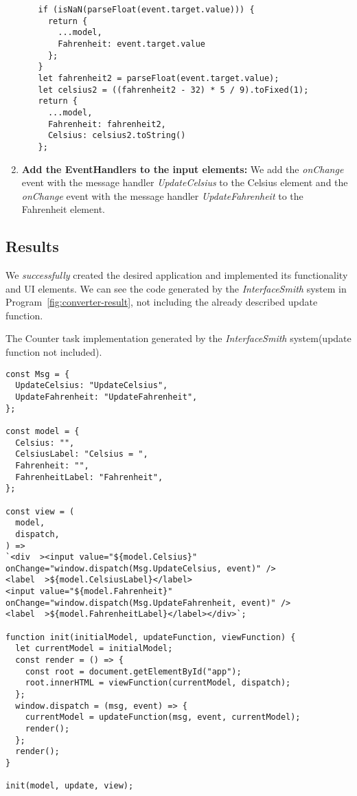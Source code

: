 \begin{enumerate}
\begin{itemize}
\begin{listing}[htbp]
			            \begin{lstlisting}
if (isNaN(parseFloat(event.target.value))) {
  return {
    ...model,
    Fahrenheit: event.target.value
  };
}
let fahrenheit2 = parseFloat(event.target.value);
let celsius2 = ((fahrenheit2 - 32) * 5 / 9).toFixed(1);
return {
  ...model,
  Fahrenheit: fahrenheit2,
  Celsius: celsius2.toString()
};            \end{lstlisting}

		            \end{listing}
	      \end{itemize}

	\item \textbf{Add the EventHandlers to the input elements:} We add the \emph{onChange} event with the message handler \emph{UpdateCelsius} to the Celsius element and the \emph{onChange} event with the message handler \emph{UpdateFahrenheit} to the Fahrenheit element.
\end{enumerate}
\medskip
\subsection{Results}
We \emph{successfully} created the desired application and implemented its functionality and UI elements.
We can see the code generated by the \emph{InterfaceSmith} system in Program~\ref{fig:converter-result}, not including the already described update function.

\begin{listing}[p]
	\caption {The Counter task implementation generated by the \emph{InterfaceSmith} system(update function not included).}
	\label{fig:converter-result}
	\begin{lstlisting}
const Msg = {
  UpdateCelsius: "UpdateCelsius",
  UpdateFahrenheit: "UpdateFahrenheit",
};

const model = {
  Celsius: "",
  CelsiusLabel: "Celsius = ",
  Fahrenheit: "",
  FahrenheitLabel: "Fahrenheit",
};

const view = (
  model,
  dispatch,
) =>
`<div  ><input value="${model.Celsius}" onChange="window.dispatch(Msg.UpdateCelsius, event)" />
<label  >${model.CelsiusLabel}</label>
<input value="${model.Fahrenheit}" onChange="window.dispatch(Msg.UpdateFahrenheit, event)" />
<label  >${model.FahrenheitLabel}</label></div>`;

function init(initialModel, updateFunction, viewFunction) {
  let currentModel = initialModel;
  const render = () => {
    const root = document.getElementById("app");
    root.innerHTML = viewFunction(currentModel, dispatch);
  };
  window.dispatch = (msg, event) => {
    currentModel = updateFunction(msg, event, currentModel);
    render();
  };
  render();
}

init(model, update, view);
\end{lstlisting}
\end{listing}


